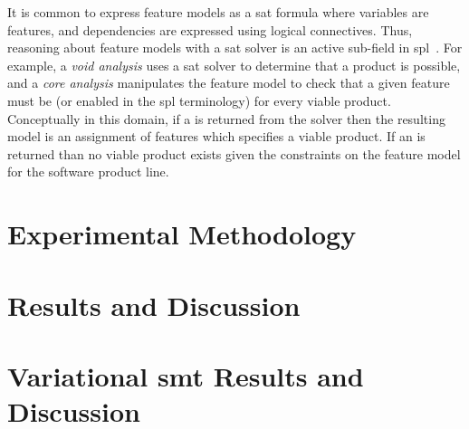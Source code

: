 It is common to express feature models as a \ac{sat} formula where variables are
features, and dependencies are expressed using logical connectives. Thus,
reasoning about feature models with a \ac{sat} solver is an active sub-field in
\acl{spl}~\cite{BSRC10,GBT+19,BSTRC06,TAK+:SE15}. For example, a \emph{void
  analysis} uses a \ac{sat} solver to determine that a product is possible, and
a \emph{core analysis} manipulates the feature model to check that a given
feature must be \tru{} (or enabled in the \ac{spl} terminology) for every viable
product. Conceptually in this domain, if a  is returned from the solver
then the resulting model is an assignment of features which specifies a viable
product. If an  is returned than no viable product exists given the
constraints on the feature model for the software product line.

\section{Experimental Methodology}

%
\section{Results and Discussion}


\section{Variational \ac{smt} Results and Discussion}


